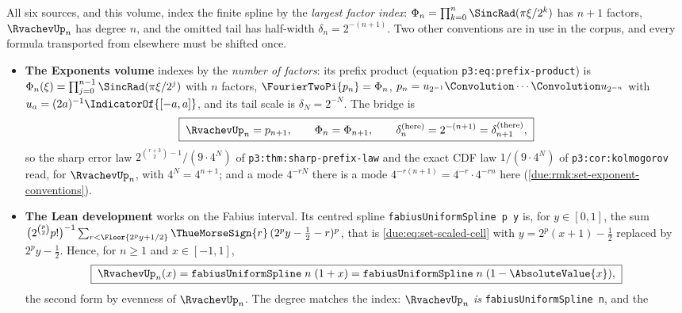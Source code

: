 \documentclass[11pt,oneside]{article}
\theoremstyle{plain}
\theoremstyle{definition}
\theoremstyle{remark}
\newcommand{\upn}[1]{\RvachevUp_{#1}}
\newcommand{\Phin}[1]{\Phi_{#1}}                            %
\begin{document}
\begin{warningbox}[title={One spline, three indexings}]
All six sources, and this volume, index the finite spline by the
\emph{largest factor index}: $\Phin{n}=\prod_{k=0}^{n}\SincRad(\pi\xi/2^{k})$
has $n+1$ factors, $\upn{n}$ has degree $n$, and the omitted tail has
half-width $\delta_n=2^{-(n+1)}$.  Two other conventions are in use in the
corpus, and every formula transported from elsewhere must be shifted once.
\begin{itemize}
\item \textbf{The Exponents volume} \cite{proveit-exponents} indexes by the
      \emph{number of factors}: its prefix product (equation
      \texttt{p3:eq:prefix-product}) is
      $\Phi_n(\xi)=\prod_{j=0}^{n-1}\SincRad(\pi\xi/2^{j})$ with $n$ factors,
      $\FourierTwoPi{p_n}=\Phi_n$, $p_n=u_{2^{-1}}\Convolution\cdots\Convolution u_{2^{-n}}$
      with $u_a=(2a)^{-1}\IndicatorOf{[-a,a]}$, and its tail scale is
      $\delta_N=2^{-N}$.  The bridge is
      \begin{equation}
       \boxed{\;\upn{n}=p_{n+1},\qquad \Phin{n}=\Phi_{n+1},\qquad
       \delta_n^{\text{(here)}}=2^{-(n+1)}=\delta_{n+1}^{\text{(there)}},\;}
       \label{due:eq:set-bridge-exponents}
      \end{equation}
      so the sharp error law $2^{\binom{r+3}{2}-1}/(9\cdot4^{N})$ of
      \texttt{p3:thm:sharp-prefix-law} and the exact CDF law
      $1/(9\cdot4^{N})$ of \texttt{p3:cor:kolmogorov} read, for $\upn{n}$,
      with $4^{N}=4^{n+1}$; and a mode $4^{-rN}$ there is a mode
      $4^{-r(n+1)}=4^{-r}\cdot4^{-rn}$ here
      (\cref{due:rmk:set-exponent-conventions}).
\item \textbf{The Lean development} \cite{proveit-primary} works on the
      Fabius interval.  Its centred spline
      \texttt{fabiusUniformSpline p y} is, for $y\in[0,1]$, the sum
      $\bigl(2^{\binom p2}p!\bigr)^{-1}\sum_{r<\Floor{2^{p}y+1/2}}
      \ThueMorseSign{r}\,(2^{p}y-\tfrac12-r)^{p}$, that is
      \cref{due:eq:set-scaled-cell} with $y=2^{p}(x+1)-\frac12$ replaced
      by $2^{p}y-\frac12$.  Hence, for $n\ge1$ and $x\in[-1,1]$,
      \begin{equation}
       \boxed{\;\upn{n}(x)=\mathtt{fabiusUniformSpline}\;n\;(1+x)
       =\mathtt{fabiusUniformSpline}\;n\;(1-\AbsoluteValue{x}),\;}
       \label{due:eq:set-bridge-lean}
      \end{equation}
      the second form by evenness of $\upn{n}$.  The degree matches the
      index: $\upn{n}$ \emph{is} \texttt{fabiusUniformSpline n}, and the

\end{itemize}
\end{warningbox}
\end{document}
